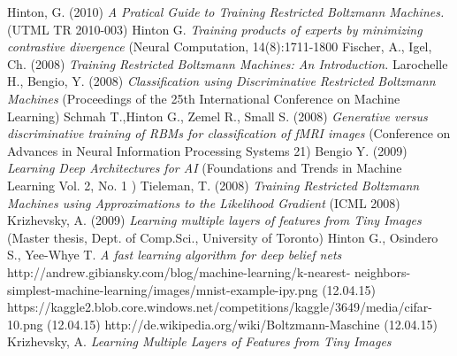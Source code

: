 \documentclass[a4paper]{scrartcl}
\begin{document}
\newpage

\begin{thebibliography}{9}
    Hinton, G. (2010) \emph{A Pratical Guide to Training Restricted 			Boltzmann Machines.} (UTML TR 2010-003)
    Hinton G. \emph{Training products of experts by minimizing contrastive divergence} (Neural Computation, 14(8):1711-1800
    Fischer, A., Igel, Ch. (2008) \emph{Training Restricted Boltzmann 		Machines: An Introduction.} 
    Larochelle H., Bengio, Y. (2008) \emph {Classification using 			Discriminative Restricted Boltzmann Machines} (Proceedings of the 25th International 			Conference on Machine Learning)
    Schmah T.,Hinton G., Zemel R., Small S. (2008) \emph{Generative 			versus discriminative training of RBMs
	for classification of fMRI images} (Conference on Advances in Neural Information 				Processing Systems 21)
    Bengio Y. (2009) \emph {Learning Deep Architectures for AI} 				(Foundations and Trends in Machine Learning
	Vol. 2, No. 1 )
    Tieleman, T. (2008) \emph{Training Restricted Boltzmann Machines 		using Approximations to
	the Likelihood Gradient} (ICML 2008)
	 Krizhevsky, A. (2009) \emph{Learning multiple layers of features 	from Tiny Images} (Master thesis, Dept. of Comp.Sci., University of 	Toronto)	
    Hinton G., Osindero S., Yee-Whye T. \emph {A fast learning 			algorithm for deep belief nets}
    http://andrew.gibiansky.com/blog/machine-learning/k-nearest-		neighbors-simplest-machine-learning/images/mnist-example-ipy.png (12.04.15)
    https://kaggle2.blob.core.windows.net/competitions/kaggle/3649/media/cifar-10.png (12.04.15)
    http://de.wikipedia.org/wiki/Boltzmann-Maschine (12.04.15)
     Krizhevsky, A. \emph{Learning Multiple Layers of Features from Tiny Images}
\end{thebibliography}
\end{document}
